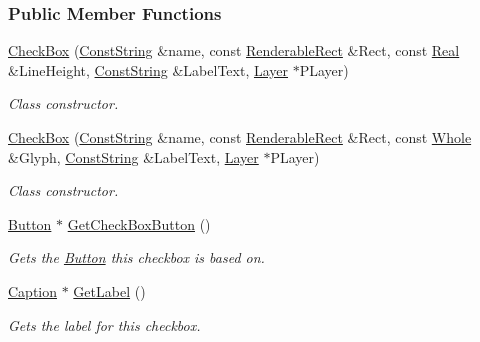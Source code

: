 \subsubsection*{Public Member Functions}
\begin{DoxyCompactItemize}
\item 
\hyperlink{classMezzanine_1_1UI_1_1CheckBox_a818afe38244e1cd196c65bf36bf1719a}{CheckBox} (\hyperlink{namespaceMezzanine_a63cd699ac54b73953f35ec9cfc05e506}{ConstString} \&name, const \hyperlink{structMezzanine_1_1UI_1_1RenderableRect}{RenderableRect} \&Rect, const \hyperlink{namespaceMezzanine_a726731b1a7df72bf3583e4a97282c6f6}{Real} \&LineHeight, \hyperlink{namespaceMezzanine_a63cd699ac54b73953f35ec9cfc05e506}{ConstString} \&LabelText, \hyperlink{classMezzanine_1_1UI_1_1Layer}{Layer} $\ast$PLayer)
\begin{DoxyCompactList}\small\item\em Class constructor. \item\end{DoxyCompactList}\item 
\hyperlink{classMezzanine_1_1UI_1_1CheckBox_aedc495e50db3adf0ed51b3c28107af3f}{CheckBox} (\hyperlink{namespaceMezzanine_a63cd699ac54b73953f35ec9cfc05e506}{ConstString} \&name, const \hyperlink{structMezzanine_1_1UI_1_1RenderableRect}{RenderableRect} \&Rect, const \hyperlink{namespaceMezzanine_adcbb6ce6d1eb4379d109e51171e2e493}{Whole} \&Glyph, \hyperlink{namespaceMezzanine_a63cd699ac54b73953f35ec9cfc05e506}{ConstString} \&LabelText, \hyperlink{classMezzanine_1_1UI_1_1Layer}{Layer} $\ast$PLayer)
\begin{DoxyCompactList}\small\item\em Class constructor. \item\end{DoxyCompactList}\item 
\hyperlink{classMezzanine_1_1UI_1_1Button}{Button} $\ast$ \hyperlink{classMezzanine_1_1UI_1_1CheckBox_a08fcd8aa8c6a521f4f08dc3ae6984936}{GetCheckBoxButton} ()
\begin{DoxyCompactList}\small\item\em Gets the \hyperlink{classMezzanine_1_1UI_1_1Button}{Button} this checkbox is based on. \item\end{DoxyCompactList}\item 
\hyperlink{classMezzanine_1_1UI_1_1Caption}{Caption} $\ast$ \hyperlink{classMezzanine_1_1UI_1_1CheckBox_adde59a08d00bad4085aad204d29d48d1}{GetLabel} ()
\begin{DoxyCompactList}\small\item\em Gets the label for this checkbox. \item\end{DoxyCompactList}\item 

\end{DoxyCompactItemize}
